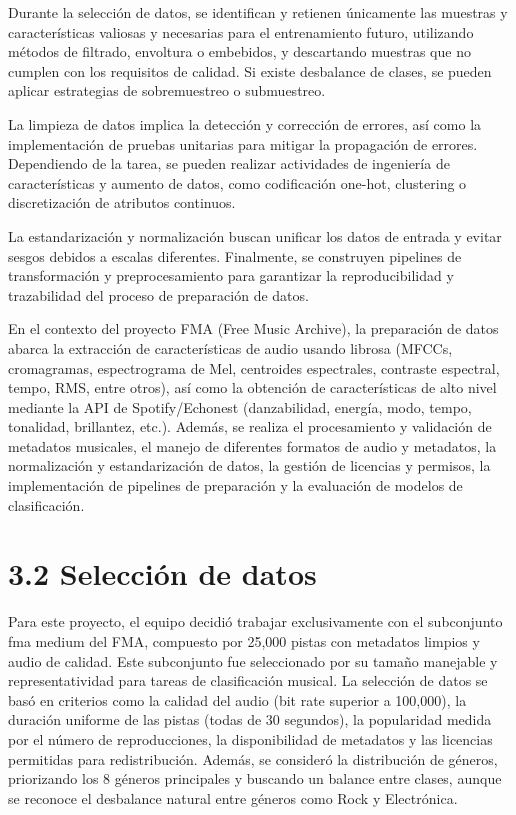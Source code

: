 \documentclass{article}
\begin{document}
Durante la selección de datos, se identifican y retienen únicamente las muestras y características valiosas y necesarias para el entrenamiento futuro, utilizando métodos de filtrado, envoltura o embebidos, y descartando muestras que no cumplen con los requisitos de calidad. Si existe desbalance de clases, se pueden aplicar estrategias de sobremuestreo o submuestreo.

La limpieza de datos implica la detección y corrección de errores, así como la implementación de pruebas unitarias para mitigar la propagación de errores. Dependiendo de la tarea, se pueden realizar actividades de ingeniería de características y aumento de datos, como codificación one-hot, clustering o discretización de atributos continuos.

La estandarización y normalización buscan unificar los datos de entrada y evitar sesgos debidos a escalas diferentes. Finalmente, se construyen pipelines de transformación y preprocesamiento para garantizar la reproducibilidad y trazabilidad del proceso de preparación de datos.

En el contexto del proyecto FMA (Free Music Archive), la preparación de datos abarca la extracción de características de audio usando librosa (MFCCs, cromagramas, espectrograma de Mel, centroides espectrales, contraste espectral, tempo, RMS, entre otros), así como la obtención de características de alto nivel mediante la API de Spotify/Echonest (danzabilidad, energía, modo, tempo, tonalidad, brillantez, etc.). Además, se realiza el procesamiento y validación de metadatos musicales, el manejo de diferentes formatos de audio y metadatos, la normalización y estandarización de datos, la gestión de licencias y permisos, la implementación de pipelines de preparación y la evaluación de modelos de clasificación.

\section*{3.2 Selección de datos}
Para este proyecto, el equipo decidió trabajar exclusivamente con el subconjunto fma medium del FMA, compuesto por 25,000 pistas con metadatos limpios y audio de calidad. Este subconjunto fue seleccionado por su tamaño manejable y representatividad para tareas de clasificación musical. La selección de datos se basó en criterios como la calidad del audio (bit rate superior a 100,000), la duración uniforme de las pistas (todas de 30 segundos), la popularidad medida por el número de reproducciones, la disponibilidad de metadatos y las licencias permitidas para redistribución. Además, se consideró la distribución de géneros, priorizando los 8 géneros principales y buscando un balance entre clases, aunque se reconoce el desbalance natural entre géneros como Rock y Electrónica.
\end{document}

